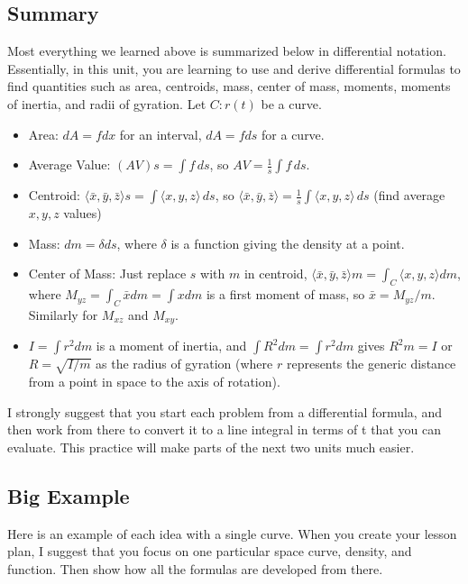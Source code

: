 \subsection{Summary}
Most everything we learned above is summarized below in differential
notation.  Essentially, in this unit, you are learning to
use and derive differential formulas to find quantities such as area,
centroids, mass, center of mass, moments, moments of
inertia, and radii of gyration.  Let $C\colon r(t)$ be a curve.
\begin{itemize}
\item Area: $dA = fdx$ for an interval, $dA=fds $ for a curve.
\item Average Value: $(AV) s = \int f \,ds$, so $AV=\frac 1 s \int f\,ds$.
\item Centroid: $\langle\bar x,\bar y,\bar z\rangle s =\int
\langle x,y,z\rangle\, ds$, so $\langle\bar x,\bar y,\bar z\rangle= \frac 1 s \int \langle x,y,z\rangle\,ds$ (find average $x,y,z$ values)
\item Mass: $dm = \delta ds $, where $\delta$ is a function giving the density at a point.
\item Center of Mass: Just replace $s$ with $m$ in centroid,
$\langle\bar x,\bar y,\bar z\rangle m = \int_C \langle x,y,z\rangle dm$,
where $M_{yz}=\int_C \bar x dm = \int x dm$ is a first moment of mass, so $\bar x = M_{yz}/m$.  Similarly for $M_{xz}$ and $M_{xy}$.
\item $I = \int r^2 dm$ is a moment of inertia, and $\int R^2 dm = \int r^2 dm$
gives $R^2 m =I$ or $R=\sqrt{I/m}$ as the radius of gyration (where
$r$ represents the generic distance from a point in space to the axis
of rotation).
\end{itemize}
I strongly suggest that you start each problem from a differential
formula, and then work from there to convert it to a line integral in
terms of t that you can evaluate.  This practice will make parts of
the next two units much easier.


\subsection{Big Example}
%
Here is an example of each idea with a single curve. When you create
your lesson plan, I suggest that you focus on one particular space
curve, density, and function.  Then show how all the formulas are
developed from there.

